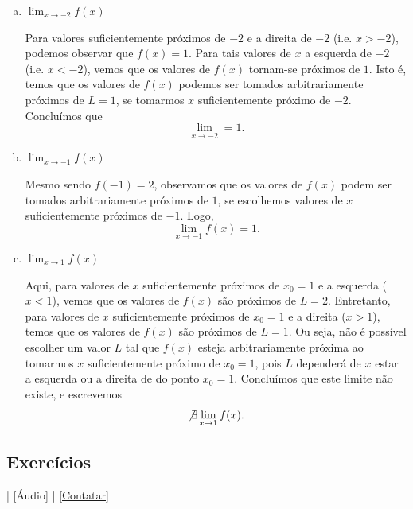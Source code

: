 \begin{resol}
  \begin{enumerate}[a)]
  \item $\displaystyle \lim_{x\to -2} f(x)$

    Para valores suficientemente próximos de $-2$ e a direita de $-2$ (i.e. $x>-2$), podemos observar que $f(x)=1$. Para tais valores de $x$ a esquerda de $-2$ (i.e. $x<-2$), vemos que os valores de $f(x)$ tornam-se próximos de $1$. Isto é, temos que os valores de $f(x)$ podemos ser tomados arbitrariamente próximos de $L=1$, se tomarmos $x$ suficientemente próximo de $-2$. Concluímos que
    \begin{equation}
      \lim_{x\to -2} = 1.
    \end{equation}

  \item $\displaystyle \lim_{x\to -1} f(x)$

    Mesmo sendo $f(-1)=2$, observamos que os valores de $f(x)$ podem ser tomados arbitrariamente próximos de $1$, se escolhemos valores de $x$ suficientemente próximos de $-1$. Logo,
    \begin{equation}
      \lim_{x\to -1} f(x) = 1.
    \end{equation}

    \item $\displaystyle \lim_{x\to 1} f(x)$

      Aqui, para valores de $x$ suficientemente próximos de $x_0=1$ e a esquerda ($x<1$), vemos que os valores de $f(x)$ são próximos de $L=2$. Entretanto, para valores de $x$ suficientemente próximos de $x_0=1$ e a direita ($x>1$), temos que os valores de $f(x)$ são próximos de $L=1$. Ou seja, não é possível escolher um valor $L$ tal que $f(x)$ esteja arbitrariamente próxima ao tomarmos $x$ suficientemente próximo de $x_0=1$, pois $L$ dependerá de $x$ estar a esquerda ou a direita de do ponto $x_0 = 1$. Concluímos que este limite não existe, e escrevemos
      \begin{equation}
        \not\exists\lim_{x\to 1} f(x).
      \end{equation}
  \end{enumerate}
\end{resol}

\subsection*{Exercícios}

\begin{flushright}
  [Vídeo] | [Áudio] | \href{https://phkonzen.github.io/notas/contato.html}{[Contatar]}
\end{flushright}

